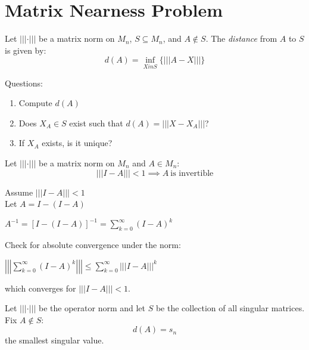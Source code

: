 \documentclass[letterpaper,12pt,fleqn]{article}
\newcommand{\mnorm}[1]{\left|\left|\left|#1\right|\right|\right|}
\begin{document}
\section*{Matrix Nearness Problem}

\begin{definition}[Distance]
  Let $\mnorm{\cdot}$ be a matrix norm on $M_n$, $S\subseteq M_n$, and
  $A\notin S$. The \emph{distance} from $A$ to $S$ is given by:
  \[d(A)=\inf_{Xin S}\{\mnorm{A-X}\}\]
\end{definition}

Questions:
\begin{enumerate}
\item Compute $d(A)$
\item Does $X_A\in S$ exist such that $d(A)=\mnorm{X-X_A}$?
\item If $X_A$ exists, is it unique?
\end{enumerate}

\begin{lemma}
  Let $\mnorm{\cdot}$ be a matrix norm on $M_n$ and $A\in M_n$:
  \[\mnorm{I-A}<1\implies A\ \mbox{is invertible}\]
\end{lemma}

\begin{theproof}
  Assume $\mnorm{I-A}<1$ \\
  Let $A=I-(I-A)$
  
  $A^{-1}=[I-(I-A)]^{-1}=\sum_{k=0}^{\infty}(I-A)^k$
  
  Check for absolute convergence under the norm:

  $\mnorm{\sum_{k=0}^{\infty}(I-A)^k}\le\sum_{k=0}^{\infty}\mnorm{I-A}^k$

  which converges for $\mnorm{I-A}<1$.
\end{theproof}

\begin{theorem}
  Let $\mnorm{\cdot}$ be the operator norm and let $S$ be the collection of all
  singular matrices. Fix $A\notin S$:
  \[d(A)=s_n\]
  the smallest singular value.
\end{theorem}
\end{document}
